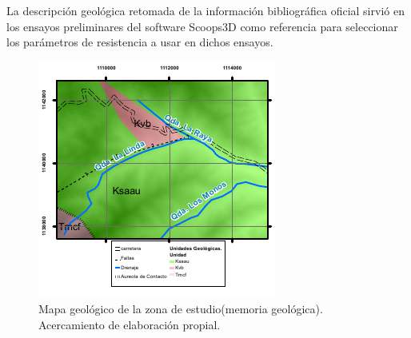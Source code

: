 La descripci\'on geol\'ogica retomada de la informaci\'on bibliogr\'afica oficial sirvi\'o en los ensayos preliminares del software Scoops3D como referencia para seleccionar los par\'ametros de resistencia a usar en dichos ensayos.

\begin{figure}[H]
\centering
\includegraphics[scale=3]{img/geologia.pdf}
\caption{Mapa geol\'ogico de la zona de estudio(memoria geol\'ogica). Acercamiento de elaboraci\'on propial.}
\label{fig:mapageo}
\end{figure}


